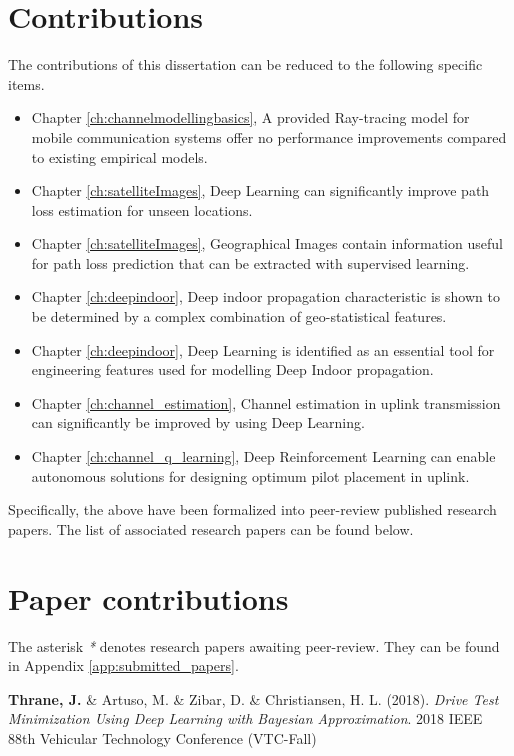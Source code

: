 \section*{Contributions}

The contributions of this dissertation can be reduced to the following specific items. 

\begin{itemize}
    \item Chapter \ref{ch:channelmodellingbasics}, A provided Ray-tracing model for mobile communication systems offer no performance improvements compared to existing empirical models.
    \item Chapter \ref{ch:satelliteImages}, Deep Learning can significantly improve path loss estimation for unseen locations.
    \item Chapter \ref{ch:satelliteImages}, Geographical Images contain information useful for path loss prediction that can be extracted with supervised learning.
    \item Chapter \ref{ch:deepindoor}, Deep indoor propagation characteristic is shown to be determined by a complex combination of geo-statistical features.
    \item Chapter \ref{ch:deepindoor}, Deep Learning is identified as an essential tool for engineering features used for modelling Deep Indoor propagation.
    \item Chapter \ref{ch:channel_estimation}, Channel estimation in uplink transmission can significantly be improved by using Deep Learning.
    \item Chapter \ref{ch:channel_q_learning}, Deep Reinforcement Learning can enable autonomous solutions for designing optimum pilot placement in uplink.
\end{itemize}

\noindent Specifically, the above have been formalized into peer-review published research papers. The list of associated research papers can be found below.


\section*{Paper contributions}

The asterisk \emph{*} denotes research papers awaiting peer-review. They can be found in Appendix \ref{app:submitted_papers}.

\vspace{2em}

\noindent \textbf{Thrane, J.} \&  Artuso, M. \&  Zibar, D. \&  Christiansen, H. L. (2018). \textit{Drive Test Minimization Using Deep Learning with Bayesian Approximation}. 2018 IEEE 88th Vehicular Technology Conference (VTC-Fall) \cite{Thrane2018DriveApproximation}

